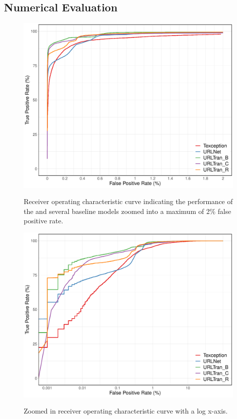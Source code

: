\subsection{Numerical Evaluation}


\begin{figure}
    \centering
	\includegraphics[width=0.7\linewidth,alt={ROC curev indicating impromvents of our model over baseline models upto a maximum of 2\% FPR}]{urltran/figures/roc_0_02_R.pdf}
	\caption{Receiver operating characteristic curve indicating the performance of the \URLTranSys and several baseline models zoomed into a maximum of 2\% false positive rate.}
	\label{fig:urltran:transformer2}
\end{figure}

\begin{figure}
    \centering
	\includegraphics[width=0.7\linewidth,alt={Zoomed in full ROC curve with a log x-axis.}]{urltran/figures/log_roc_R.pdf}
	\caption{Zoomed in receiver operating characteristic curve with a log x-axis.}
	\label{fig:urltran:log_transformer2}
\end{figure}



